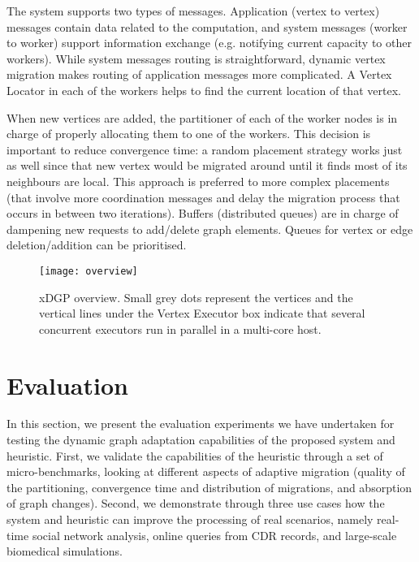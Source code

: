 \documentclass{sig-alternate-10pt}
\begin{document}
The system supports two types of messages. Application (vertex to vertex) messages contain data related to the computation, and system messages (worker to worker) support information exchange (e.g. notifying current capacity to other workers). While system messages routing is straightforward, dynamic vertex migration makes routing of application messages more complicated. A Vertex Locator in each of the workers helps to find the current location of that vertex.

When new vertices are added, the partitioner of each of the worker nodes is in charge of properly allocating them to one of the workers. This decision is important to reduce convergence time: a random placement strategy works just as well since that new vertex would be migrated around until it finds most of its neighbours are local. This approach is preferred to more complex placements (that involve more coordination messages and delay the migration process that occurs in between two iterations). Buffers (distributed queues) are in charge of dampening new requests to add/delete graph elements. Queues for vertex or edge deletion/addition can be prioritised.

\begin{figure*}
\centering
\texttt{[image: overview]}
\caption{ xDGP overview. Small grey dots represent the vertices and the vertical lines under the Vertex Executor box indicate that several concurrent executors run in parallel in a multi-core host.}
\label{fig:overview}

\end{figure*}



\section{Evaluation}
\label{sec:eval}

In this section, we present the evaluation experiments we have undertaken for testing the dynamic graph adaptation capabilities of the proposed system and heuristic. First, we validate the capabilities of the heuristic through a set of micro-benchmarks, looking at different aspects of adaptive migration (quality of the partitioning, convergence time and distribution of migrations, and absorption of graph changes). Second, we demonstrate through three use cases how the system and heuristic can improve the processing of real scenarios, namely real-time social network analysis, online queries from CDR records, and large-scale biomedical simulations.
\end{document}
